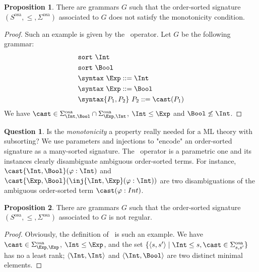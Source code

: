 \documentclass{article}
\theoremstyle{definition}
\theoremstyle{definition}
\theoremstyle{definition}
\theoremstyle{definition}
\theoremstyle{definition}
\newtheorem{question}{Question}[section]
\theoremstyle{theorem}
\theoremstyle{theorem}
\theoremstyle{theorem}
\theoremstyle{theorem}
\newtheorem{proposition}{Proposition}[section]
\theoremstyle{theorem}
\newcommand{\sort}{\texttt{sort}}
\begin{document}
{\begin{proposition}\label{prop:non-monoton}
There are grammars $G$ such that the order-sorted signature $(S^\textrm{osa},\le, \Sigma^\textrm{osa})$ associated to $G$ does not satisfy the monotonicity condition.
\end{proposition}
\begin{proof}
Such an example is given by the \cast\ operator. Let $G$ be the following grammar:
\begin{align*}
&\sort\ \Int\\
&\sort\ \Bool\\
&\syntax\ \Exp ::= \Int\\
&\syntax\ \Exp ::= \Bool\\
&\syntax\{P_1,P_2\}\ P_2 ::= \cast(P_1) 
\end{align*}
We have $\cast\in\Sigma^\textrm{osa}_{\Int,\Bool}\cap \Sigma^\textrm{osa}_{\Exp,\Int}$, $\Int\le \Exp$ and $\Bool\not\le \Int$.
\end{proof}
\begin{question}
Is the \emph{monotonicity} a property really needed for a ML theory with subsorting? We use parameters and injections to "encode" an order-sorted signature as a many-sorted signature.
The \cast\ operator is a parametric one and its instances clearly disambiguate ambiguous order-sorted terms. For instance, $\cast\{\Int,\Bool\}(\varphi:\Int)$ and $\cast\{\Exp,\Bool\}(\inj\{\Int,\Exp\}(\varphi:\Int))$ are two disambiguations of the ambiguous order-sorted term $\cast(\varphi:Int)$.
\end{question}

\begin{proposition}\label{prop:non-regular}
There are grammars $G$ such that the order-sorted signature $(S^\textrm{osa},\le, \Sigma^\textrm{osa})$ associated to $G$ is not regular.
\end{proposition}
\begin{proof}
Obviously, the definition of \cast\ is such an example. We have $\cast\in\Sigma^\textrm{osa}_{\Exp,\Exp}$, $\Int\le\Exp$,  and the set $\{\langle s,s'\rangle\mid\Int\le s, \cast\in\Sigma^\textrm{osa}_{s,s'}\}$ has no a least rank; $\langle \Int,\Int\rangle$ and $\langle \Int,\Bool\rangle$ are two distinct minimal elements. 


\end{proof}}
\end{document}
